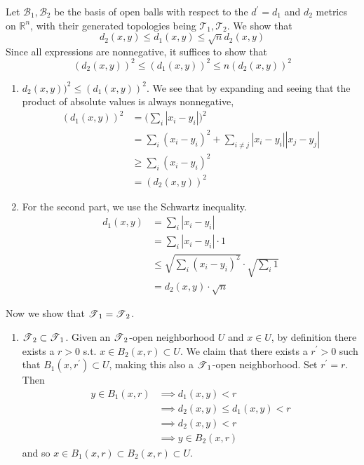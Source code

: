   \begin{solution}[Munkres 20.1.a] 
    Let $\mathscr{B}_1, \mathscr{B}_2$ be the basis of open balls with respect to the $d^\prime = d_1$ and $d_2$ metrics on $\mathbb{R}^n$, with their generated topologies being $\mathscr{T}_1, \mathscr{T}_2$. We show that 
    \begin{equation}
      d_2 (x, y) \leq d_1 (x, y) \leq \sqrt{n} d_2 (x, y)
    \end{equation} 
    Since all expressions are nonnegative, it suffices to show that 
    \begin{equation}
      (d_2 (x, y))^2 \leq (d_1 (x, y))^2 \leq n (d_2 (x, y))^2
    \end{equation} 
    \begin{enumerate}
      \item $d_2 (x, y))^2 \leq (d_1 (x, y))^2$. We see that by expanding and seeing that the product of absolute values is always nonnegative, 
      \begin{align}
        (d_1 (x, y))^2 & = \bigg( \sum_i |x_i - y_i| \bigg)^2 \\
                       & = \sum_i (x_i - y_i)^2 + \sum_{i \neq j} |x_i - y_i| |x_j - y_j| \\ 
                       & \geq \sum_i (x_i - y_i)^2 \\
                       & = (d_2 (x, y))^2
      \end{align}

      \item For the second part, we use the Schwartz inequality. 
      \begin{align}
        d_1 (x, y) & = \sum_i |x_i - y_i| \\ 
                   & = \sum_i |x_i - y_i| \cdot 1 \\
                   & \leq \sqrt{\sum_i (x_i - y_i)^2} \cdot \sqrt{\sum_i 1} \\
                   & = d_2 (x, y) \cdot \sqrt{n}
      \end{align}
    \end{enumerate}
    Now we show that $\operatorname{\mathscr{T}}_1 = \operatorname{\mathscr{T}}_2$. 
    \begin{enumerate} 
      \item $\operatorname{\mathscr{T}}_2 \subset \operatorname{\mathscr{T}}_1$. Given an $\operatorname{\mathscr{T}}_2$-open neighborhood $U$ and $x \in U$, by definition there exists a $r > 0$ s.t. $x \in B_2 (x, r) \subset U$. We claim that there exists a $r^\prime > 0$ such that $B_1 (x, r^\prime) \subset U$, making this also a $\operatorname{\mathscr{T}}_1$-open neighborhood. Set $r^\prime = r$. Then 
      \begin{align}
        y \in B_1 (x, r) & \implies d_1 (x, y) < r \\
                         & \implies d_2 (x, y) \leq d_1 (x, y) < r \\
                         & \implies d_2 (x, y) < r \\
                         & \implies y \in B_2 (x, r)
      \end{align}
      and so $x \in B_1 (x, r) \subset B_2 (x, r) \subset U$. 


\end{enumerate}
\end{solution}
